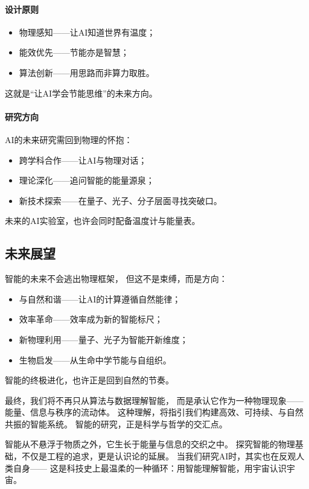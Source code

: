 \paragraph{设计原则}
\begin{itemize}
\item 物理感知——让AI知道世界有温度；
\item 能效优先——节能亦是智慧；
\item 算法创新——用思路而非算力取胜。
\end{itemize}
这就是“让AI学会节能思维”的未来方向。

\paragraph{研究方向}
AI的未来研究需回到物理的怀抱：
\begin{itemize}
\item 跨学科合作——让AI与物理对话；
\item 理论深化——追问智能的能量源泉；
\item 新技术探索——在量子、光子、分子层面寻找突破口。
\end{itemize}
未来的AI实验室，也许会同时配备温度计与能量表。

\subsection{未来展望}

智能的未来不会逃出物理框架，  
但这不是束缚，而是方向：
\begin{itemize}
\item 与自然和谐——让AI的计算遵循自然能律；
\item 效率革命——效率成为新的智能标尺；
\item 新物理利用——量子、光子为智能开新维度；
\item 生物启发——从生命中学节能与自组织。
\end{itemize}
智能的终极进化，也许正是回到自然的节奏。

最终，我们将不再只从算法与数据理解智能，  
而是承认它作为一种物理现象——能量、信息与秩序的流动体。  
这种理解，将指引我们构建高效、可持续、与自然共振的智能系统。  
智能的研究，正是科学与哲学的交汇点。

智能从不悬浮于物质之外，它生长于能量与信息的交织之中。  
探究智能的物理基础，不仅是工程的追求，更是认识论的延展。  
当我们研究AI时，其实也在反观人类自身——  
这是科技史上最温柔的一种循环：用智能理解智能，用宇宙认识宇宙。


